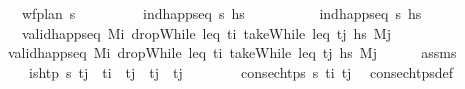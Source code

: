 \begin{isabellebody}
\ \ \ \ \ \ \ \ \ {\isachardoublequoteopen}wf{\isacharunderscore}{\kern0pt}plan\ {\isasympi}s{\isachardoublequoteclose}\isanewline
\ \ \ \ \ \ \ \ \ {\isachardoublequoteopen}ind{\isacharunderscore}{\kern0pt}happ{\isacharunderscore}{\kern0pt}seq\ {\isasympi}s\ hs\ \isanewline
\ \ \ \ \ \ \ \ \ {\isachardoublequoteopen}ind{\isacharunderscore}{\kern0pt}happ{\isacharunderscore}{\kern0pt}seq\ {\isasympi}s\ hs\ \isanewline
\ \ \ \ \ \ \ \ \ {\isachardoublequoteopen}valid{\isacharunderscore}{\kern0pt}happ{\isacharunderscore}{\kern0pt}seq\ M\isactrlsub i\ {\isacharparenleft}{\kern0pt}dropWhile\ {\isacharparenleft}{\kern0pt}leq\ t\isactrlsub i{\isacharparenright}{\kern0pt}\ {\isacharparenleft}{\kern0pt}takeWhile\ {\isacharparenleft}{\kern0pt}leq\ t\isactrlsub j{\isacharparenright}{\kern0pt}\ hs\ M\isactrlsub j{\isachardoublequoteclose}\isanewline
\ \ \ \ \ \ \ {\isachardoublequoteopen}valid{\isacharunderscore}{\kern0pt}happ{\isacharunderscore}{\kern0pt}seq\ M\isactrlsub i\ {\isacharparenleft}{\kern0pt}dropWhile\ {\isacharparenleft}{\kern0pt}leq\ t\isactrlsub i{\isacharparenright}{\kern0pt}\ {\isacharparenleft}{\kern0pt}takeWhile\ {\isacharparenleft}{\kern0pt}leq\ t\isactrlsub j{\isacharparenright}{\kern0pt}\ hs\ M\isactrlsub j{\isachardoublequoteclose}\isanewline
%
\isadelimproof
\ \ \ \ %
\endisadelimproof
%
\isatagproof
{}\isamarkupfalse%
\ assms\isanewline
\ \ \isamarkupfalse%
\ {\isacharminus}{\kern0pt}\isanewline
\ \ \ \ \isamarkupfalse%
\ {\isachardoublequoteopen}is{\isacharunderscore}{\kern0pt}htp\ {\isasympi}s\ t\isactrlsub j{\isachardoublequoteclose}\ \ {\isachardoublequoteopen}t\isactrlsub i\ {\isacharless}{\kern0pt}\ t\isactrlsub j{\isachardoublequoteclose}\ \ {\isachardoublequoteopen}t\isactrlsub j\ {\isasymle}\ t\isactrlsub j{\isachardoublequoteclose}\isanewline
\ \ \ \ \ \ \isamarkupfalse%
\ {\isacartoucheopen}consec{\isacharunderscore}{\kern0pt}htps\ {\isasympi}s\ t\isactrlsub i\ t\isactrlsub j{\isacartoucheclose}\ \isamarkupfalse%
\ consec{\isacharunderscore}{\kern0pt}htps{\isacharunderscore}{\kern0pt}def\ \isamarkupfalse%

\end{isabellebody}
